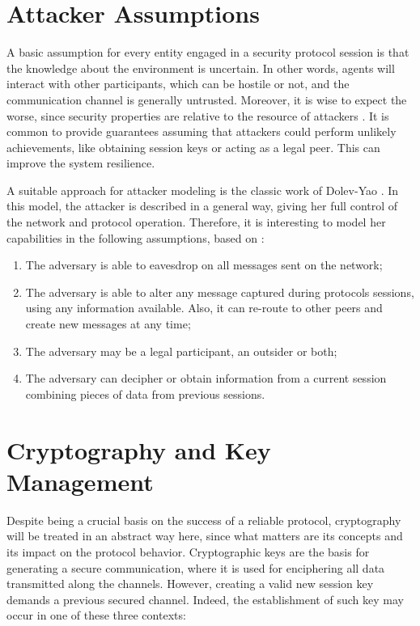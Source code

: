 \section{Attacker Assumptions}
A basic assumption for every entity engaged in a security protocol session is that the knowledge about the environment is uncertain. In other words, agents will interact with other participants, which can be hostile or not, and the communication channel is generally untrusted. Moreover, it is wise to expect the worse, since security properties are relative to the resource of attackers \cite{BoydMathuria2008}. It is common to provide guarantees assuming that attackers could perform unlikely achievements, like obtaining session keys or acting as a legal peer. This can improve the system resilience.

A suitable approach for attacker modeling is the classic work of Dolev-Yao \cite{DolevYao81}. In this model, the attacker is described in a general way, giving her full control of the network and protocol operation. Therefore, it is interesting to model her capabilities in the following assumptions, based on \cite{BoydMathuria2008}:

\begin{enumerate}
  \item The adversary is able to eavesdrop on all messages sent on the network;
  \item The adversary is able to alter any message captured during protocols sessions, using any information available. Also, it can re-route to other peers and create new messages at any time;
  \item The adversary may be a legal participant, an outsider or both;
  \item The adversary can decipher or obtain information from a current session combining pieces of data from previous sessions.
\end{enumerate}




















\section{Cryptography and Key Management}
Despite being a crucial basis on the success of a reliable protocol, cryptography will be treated in an abstract way here, since what matters are its concepts and its impact on the protocol behavior. Cryptographic keys are the basis for generating a secure communication, where it is used for enciphering all data transmitted along the channels. However, creating a valid new session key demands a previous secured channel. Indeed, the establishment of such key may occur in one of these three contexts:

